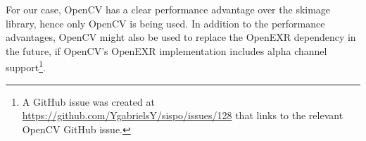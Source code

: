 For our case, OpenCV has a clear performance advantage over the \gls{skimage} library, hence only OpenCV is being used. In addition to the performance advantages, OpenCV might also be used to replace the OpenEXR dependency in the future, if OpenCV's OpenEXR implementation includes alpha channel support\footnote{A GitHub issue was created at \url{https://github.com/YgabrielsY/sispo/issues/128} that links to the relevant OpenCV GitHub issue.}.